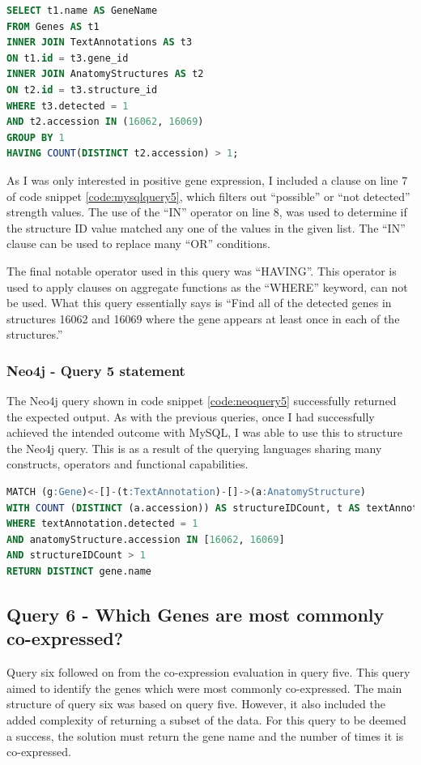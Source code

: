 \begin{lstlisting}[language=SQL, caption=MySQL query 5 statement. Which Genes are stored in structures X and Y?., label=code:mysqlquery5]
SELECT t1.name AS GeneName
FROM Genes AS t1
INNER JOIN TextAnnotations AS t3
ON t1.id = t3.gene_id
INNER JOIN AnatomyStructures AS t2
ON t2.id = t3.structure_id
WHERE t3.detected = 1
AND t2.accession IN (16062, 16069)
GROUP BY 1
HAVING COUNT(DISTINCT t2.accession) > 1;
\end{lstlisting}

As I was only interested in positive gene expression, I included a clause on line 7 of code snippet \ref{code:mysqlquery5}, which filters out ``possible'' or ``not detected'' strength values. The use of the ``IN'' operator on line 8, was used to determine if the structure ID value matched any one of the values in the given list. The ``IN'' clause can be used to replace many ``OR'' conditions.

The final notable operator used in this query was ``HAVING''. This operator is used to apply clauses on aggregate functions as the ``WHERE'' keyword, can not be used. What this query essentially says is ``Find all of the detected genes in structures 16062 and 16069 where the gene appears at least once in each of the structures.''

\subsubsection*{Neo4j - Query 5 statement}\label{neoquery5statement}
The Neo4j query shown in code snippet \ref{code:neoquery5} successfully returned the expected output. As with the previous queries, once I had successfully achieved the intended outcome with MySQL, I was able to use this to structure the Neo4j query. This is as a result of the querying languages sharing many constructs, operators and functional capabilities.

\begin{lstlisting}[language=SQL, caption=Neo4j query 5 statement. Which Genes are stored in structures X and Y?., label=code:neoquery5]
MATCH (g:Gene)<-[]-(t:TextAnnotation)-[]->(a:AnatomyStructure)
WITH COUNT (DISTINCT (a.accession)) AS structureIDCount, t AS textAnnotation, a AS anatomyStructure, g AS gene
WHERE textAnnotation.detected = 1
AND anatomyStructure.accession IN [16062, 16069]
AND structureIDCount > 1
RETURN DISTINCT gene.name
\end{lstlisting}

\subsection*{Query 6 - Which Genes are most commonly co-expressed?}\label{query6}
Query six followed on from the co-expression evaluation in query five. This query aimed to identify the genes which were most commonly co-expressed. The main structure of query six was based on query five. However, it also included the added complexity of returning a subset of the data. For this query to be deemed a success, the solution must return the gene name and the number of times it is co-expressed. 

